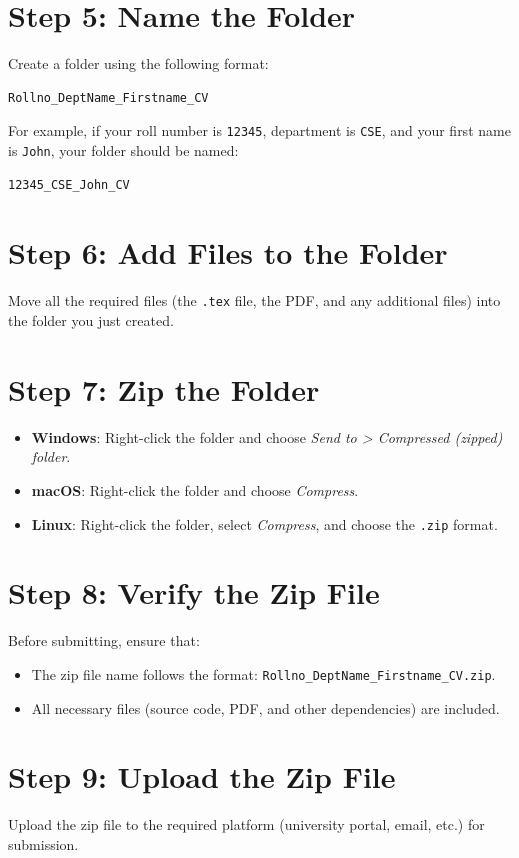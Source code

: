 \documentclass[a4paper,12pt]{article}
\begin{document}
\section{Step 5: Name the Folder}
Create a folder using the following format:
\begin{verbatim}
Rollno_DeptName_Firstname_CV
\end{verbatim}
For example, if your roll number is \texttt{12345}, department is \texttt{CSE}, and your first name is \texttt{John}, your folder should be named:
\begin{verbatim}
12345_CSE_John_CV
\end{verbatim}

\section{Step 6: Add Files to the Folder}
Move all the required files (the \texttt{.tex} file, the PDF, and any additional files) into the folder you just created.

\section{Step 7: Zip the Folder}
\begin{itemize}
    \item \textbf{Windows}: Right-click the folder and choose \textit{Send to > Compressed (zipped) folder}.
    \item \textbf{macOS}: Right-click the folder and choose \textit{Compress}.
    \item \textbf{Linux}: Right-click the folder, select \textit{Compress}, and choose the \texttt{.zip} format.
\end{itemize}

\section{Step 8: Verify the Zip File}
Before submitting, ensure that:
\begin{itemize}
    \item The zip file name follows the format: \texttt{Rollno\_DeptName\_Firstname\_CV.zip}.
    \item All necessary files (source code, PDF, and other dependencies) are included.
\end{itemize}

\section{Step 9: Upload the Zip File}
Upload the zip file to the required platform (university portal, email, etc.) for submission.
\end{document}
